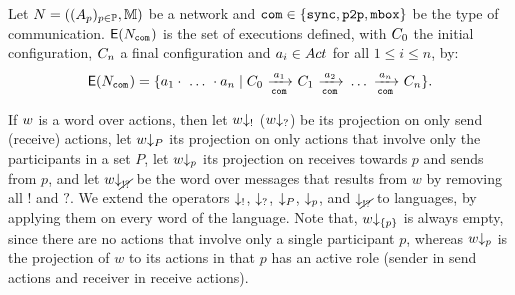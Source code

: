 \documentclass[submission,copyright,creativecommons,UKenglish]{eptcs}
\begin{document}
\begin{definition}[Execution]\label{def:execution}
  Let $N = \left((A_{p})_{p\in \mathbb{P}}, \mathbb{M}\right)$ be a network and  $\mathtt{com}\in \{\mathtt{sync}, \mathtt{p2p}, \mathtt{mbox}\}$  
 be the type of communication.  
  $\mathsf{E}(N_{{\mathtt{com}}^{}})$ is the set of executions defined, with 
  $C_0$ the initial configuration, $C_n$ a final configuration and $a_i \in 
  Act_{}$ for all $1 \leq i \leq n$, by:
$$\mathsf{E}(N_{{\mathtt{com}}^{}}) = \{a_1\cdot\ \dots\ \cdot a_n \mid  C_0\ { \xrightarrow[{\mathtt{com}}^{}]{a_1}}\ C_1{} \ { \xrightarrow[{\mathtt{com}}^{}]{a_2}}\ {} \dots \ { \xrightarrow[{\mathtt{com}}^{}]{a_n}}\ C_n{}\}.$$  
\end{definition}









If $w$ is a word over actions, then let $ w{\downarrow_{!}} $ (\resp $ w{\downarrow_{?}} $) be its projection on only send (\resp receive) actions, let $ w{\downarrow_{P}} $ its projection on only actions that involve only the participants in a set $ P $, let $ w{\downarrow_{p}} $ its projection on receives towards $ p $ and sends from $ p $, and let $ w{\downarrow_{\cancel{!?}}} $ be the word over messages that results from $ w $ by removing all $ ! $ and $ ? $.
We extend the operators $ {\downarrow_{!}} $, $ {\downarrow_{?}} $, $ {\downarrow_{P}} $, $ {\downarrow_{p}} $, and $ {\downarrow_{\cancel{!?}}} $ to languages, by applying them on every word of the language.
Note that, $ w{\downarrow_{{\left\lbrace p \right\rbrace}}} $ is always empty, since there are no actions that involve only a single participant $ p $, whereas $ w{\downarrow_{p}} $ is the projection of $ w $ to its actions in that $ p $ has an active role (sender in send actions and receiver in receive actions).
\end{document}
